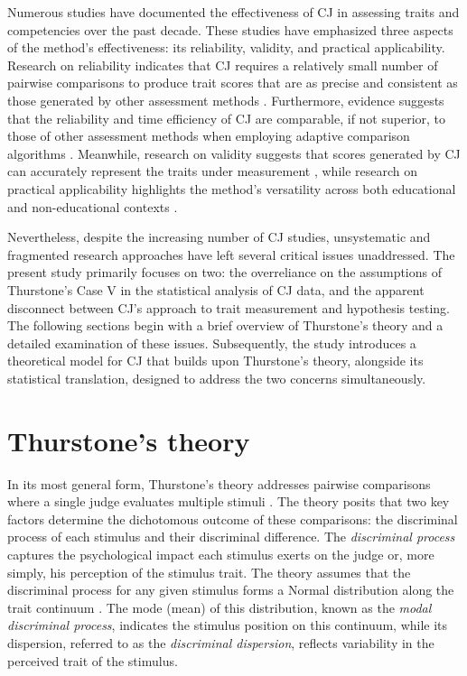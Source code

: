 \documentclass[
  authoryear,
  preprint,
  1p]{elsarticle}
\begin{document}
Numerous studies have documented the effectiveness of CJ in assessing
traits and competencies over the past decade. These studies have
emphasized three aspects of the method's effectiveness: its reliability,
validity, and practical applicability. Research on reliability indicates
that CJ requires a relatively small number of pairwise comparisons
\citep{Verhavert_et_al_2019, Crompvoets_et_al_2022} to produce trait
scores that are as precise and consistent as those generated by other
assessment methods
\citep{Coertjens_et_al_2017, Goossens_et_al_2018, Bouwer_et_al_2023}.
Furthermore, evidence suggests that the reliability and time efficiency
of CJ are comparable, if not superior, to those of other assessment
methods when employing adaptive comparison algorithms
\citep{Pollitt_2012b, Verhavert_et_al_2022, Mikhailiuk_et_al_2021}.
Meanwhile, research on validity suggests that scores generated by CJ can
accurately represent the traits under measurement
\citep{Whitehouse_2012, vanDaal_et_al_2016, Lesterhuis_2018_thesis, Bartholomew_et_al_2018, Bouwer_et_al_2023},
while research on practical applicability highlights the method's
versatility across both educational and non-educational contexts
\citep{Kimbell_2012, Jones_et_al_2015, Bartholomew_et_al_2018, Jones_et_al_2019, Marshall_et_al_2020, Bartholomew_et_al_2020, Boonen_et_al_2020}.

Nevertheless, despite the increasing number of CJ studies, unsystematic
and fragmented research approaches have left several critical issues
unaddressed. The present study primarily focuses on two: the
overreliance on the assumptions of Thurstone's Case V in the statistical
analysis of CJ data, and the apparent disconnect between CJ's approach
to trait measurement and hypothesis testing. The following sections
begin with a brief overview of Thurstone's theory and a detailed
examination of these issues. Subsequently, the study introduces a
theoretical model for CJ that builds upon Thurstone's theory, alongside
its statistical translation, designed to address the two concerns
simultaneously.

\section{Thurstone's theory}\label{sec-thurstone_theory}

In its most general form, Thurstone's theory addresses pairwise
comparisons where a single judge evaluates multiple stimuli
\citep[pp.~267]{Thurstone_1927b}. The theory posits that two key factors
determine the dichotomous outcome of these comparisons: the discriminal
process of each stimulus and their discriminal difference. The
\emph{discriminal process} captures the psychological impact each
stimulus exerts on the judge or, more simply, his perception of the
stimulus trait. The theory assumes that the discriminal process for any
given stimulus forms a Normal distribution along the trait continuum
\citep[pp.~266]{Thurstone_1927b}. The mode (mean) of this distribution,
known as the \emph{modal discriminal process}, indicates the stimulus
position on this continuum, while its dispersion, referred to as the
\emph{discriminal dispersion}, reflects variability in the perceived
trait of the stimulus.
\end{document}
